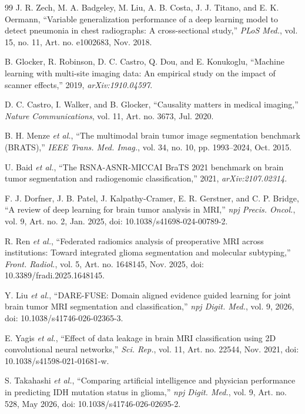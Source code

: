 \documentclass[journal]{IEEEtran}
\begin{document}
\begin{thebibliography}{99}
 J. R. Zech, M. A. Badgeley, M. Liu, A. B. Costa, J. J. Titano, and E. K. Oermann, ``Variable generalization performance of a deep learning model to detect pneumonia in chest radiographs: A cross-sectional study,'' \emph{PLoS Med.}, vol. 15, no. 11, Art. no. e1002683, Nov. 2018.

 B. Glocker, R. Robinson, D. C. Castro, Q. Dou, and E. Konukoglu, ``Machine learning with multi-site imaging data: An empirical study on the impact of scanner effects,'' 2019, \emph{arXiv:1910.04597}.

 D. C. Castro, I. Walker, and B. Glocker, ``Causality matters in medical imaging,'' \emph{Nature Communications}, vol. 11, Art. no. 3673, Jul. 2020.

 B. H. Menze \emph{et al.}, ``The multimodal brain tumor image segmentation benchmark (BRATS),'' \emph{IEEE Trans. Med. Imag.}, vol. 34, no. 10, pp. 1993--2024, Oct. 2015.

 U. Baid \emph{et al.}, ``The RSNA-ASNR-MICCAI BraTS 2021 benchmark on brain tumor segmentation and radiogenomic classification,'' 2021, \emph{arXiv:2107.02314}.

 F. J. Dorfner, J. B. Patel, J. Kalpathy-Cramer, E. R. Gerstner, and C. P. Bridge, ``A review of deep learning for brain tumor analysis in MRI,'' \emph{npj Precis. Oncol.}, vol. 9, Art. no. 2, Jan. 2025, doi: 10.1038/s41698-024-00789-2.

 R. Ren \emph{et al.}, ``Federated radiomics analysis of preoperative MRI across institutions: Toward integrated glioma segmentation and molecular subtyping,'' \emph{Front. Radiol.}, vol. 5, Art. no. 1648145, Nov. 2025, doi: 10.3389/fradi.2025.1648145.

 Y. Liu \emph{et al.}, ``DARE-FUSE: Domain aligned evidence guided learning for joint brain tumor MRI segmentation and classification,'' \emph{npj Digit. Med.}, vol. 9, 2026, doi: 10.1038/s41746-026-02365-3.

 E. Yagis \emph{et al.}, ``Effect of data leakage in brain MRI classification using 2D convolutional neural networks,'' \emph{Sci. Rep.}, vol. 11, Art. no. 22544, Nov. 2021, doi: 10.1038/s41598-021-01681-w.

 S. Takahashi \emph{et al.}, ``Comparing artificial intelligence and physician performance in predicting IDH mutation status in glioma,'' \emph{npj Digit. Med.}, vol. 9, Art. no. 528, May 2026, doi: 10.1038/s41746-026-02695-2.


\end{thebibliography}
\end{document}
